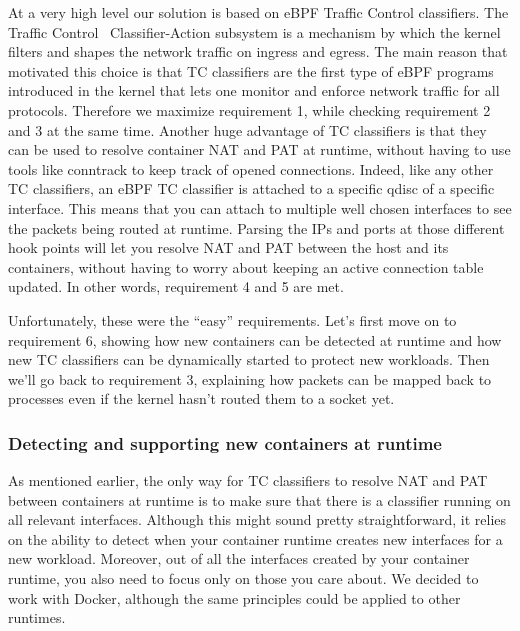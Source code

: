 At a very high level our solution is based on eBPF Traffic Control classifiers. The Traffic Control~\cite{ProcessLevelNetworkSecurityMonitoring:TrafficControlManpage} Classifier-Action subsystem is a mechanism by which the kernel filters and shapes the network traffic on ingress and egress. The main reason that motivated this choice is that TC classifiers are the first type of eBPF programs introduced in the kernel that lets one monitor and enforce network traffic for all protocols. Therefore we maximize requirement 1, while checking requirement 2 and 3 at the same time. Another huge advantage of TC classifiers is that they can be used to resolve container NAT and PAT at runtime, without having to use tools like conntrack to keep track of opened connections. Indeed, like any other TC classifiers, an eBPF TC classifier is attached to a specific qdisc of a specific interface. This means that you can attach to multiple well chosen interfaces to see the packets being routed at runtime. Parsing the IPs and ports at those different hook points will let you resolve NAT and PAT between the host and its containers, without having to worry about keeping an active connection table updated. In other words, requirement 4 and 5 are met.

Unfortunately, these were the “easy” requirements. Let’s first move on to requirement 6, showing how new containers can be detected at runtime and how new TC classifiers can be dynamically started to protect new workloads. Then we’ll go back to requirement 3, explaining how packets can be mapped back to processes even if the kernel hasn’t routed them to a socket yet.

\subsubsection{Detecting and supporting new containers at runtime}

As mentioned earlier, the only way for TC classifiers to resolve NAT and PAT between containers at runtime is to make sure that there is a classifier running on all relevant interfaces. Although this might sound pretty straightforward, it relies on the ability to detect when your container runtime creates new interfaces for a new workload. Moreover, out of all the interfaces created by your container runtime, you also need to focus only on those you care about. We decided to work with Docker, although the same principles could be applied to other runtimes.

